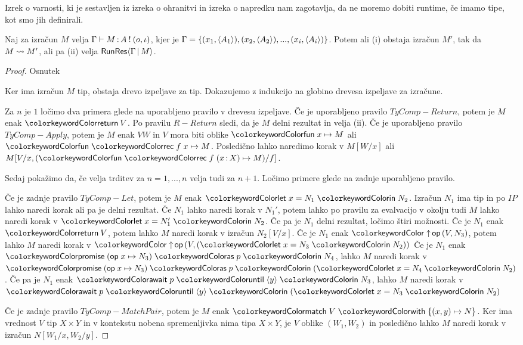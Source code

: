 Izrek o varnosti, ki je sestavljen iz izreka o ohranitvi in izreka o napredku nam zagotavlja, da ne moremo dobiti runtime, če imamo tipe, kot smo jih definirali.



\begin{trditev}[o napredku]\label{trd:gamma-napredek}
	Naj za izračun $M$ velja $\Gamma \vdash M \mathinner{:} A \mathbin{!} (o, \iota)$, kjer je $\Gamma = \{(x_1,\langle A_1 \rangle),(x_2,\langle A_2 \rangle),...,(x_i,\langle A_i \rangle)\}$. Potem ali (i) obstaja izračun $M'$, tak da $M \leadsto M'$, ali pa (ii) velja $\mathsf{RunRes}\langle\Gamma \,\vert\, M\rangle$.
\end{trditev}

\begin{proof}
	Osnutek
	
	Ker ima izračun $M$ tip, obstaja drevo izpeljave za tip.
	Dokazujemo z indukcijo na globino drevesa izpeljave za izračune.
	
	Za $n$ je $1$ ločimo dva primera glede na uporabljeno pravilo v drevesu izpeljave.
	Če je uporabljeno pravilo $TyComp-Return$, potem je $M$ enak $\tmreturn{V}$. Po pravilu $R-Return$ sledi, da je $M$ delni rezultat in velja (ii).
	Če je uporabljeno pravilo $TyComp-Apply$, potem je $M$ enak $V W$ in $V$ mora biti oblike $\tmfunano{x}{M}$ ali $\tmfunrecano{f}{x}{M}$. Posledično lahko naredimo korak v $M[W/x]$ ali $M[V/x, (\tmfunrec{f}{x \of X}{M})/f]$.
	
	Sedaj pokažimo da, če velja trditev za $n = 1,...,n$ velja tudi za $n+1$.
	Ločimo primere glede na zadnje uporabljeno pravilo.
	
	Če je zadnje pravilo $TyComp-Let$, potem je $M$ enak $\tmlet{x}{N_1}{N_2}$.
	Izračun $N_1$ ima tip in po $IP$ lahko naredi korak ali pa je delni rezultat. Če $N_1$ lahko naredi korak v $N_1'$, potem lahko po pravilu za evalvacijo v okolju tudi $M$ lahko naredi korak v $\tmlet{x}{N_1'}{N_2}$.
	Če pa je $N_1$ delni rezultat, ločimo štiri možnosti. 
	Če je $N_1$ enak $\tmreturn{V}$, potem lahko $M$ naredi korak v izračun $N_2[V/x]$. 
	Če je $N_1$ enak $\tmopout{op}{V}{N_3}$, potem lahko $M$ naredi korak v $\tmopout{op}{V}{(\tmlet{x}{N_3}{N_2})}$
	Če je $N_1$ enak $\tmwith{op}{x}{N_3}{p}{N_4}$, lahko $M$ naredi korak v $\tmwith{op}{x}{N_3}{p}{(\tmlet{x}{N_4}{N_2})}$. 
	Če pa je $N_1$ enak $\tmawait{p}{y}{N_3}$, lahko $M$ naredi korak v $\tmawait{p}{y}{(\tmlet{x}{N_3}{N_2})}$
	
	Če je zadnje pravilo $TyComp-MatchPair$, potem je $M$ enak $\tmmatch{V}{(x,y) \mapsto N}$. Ker ima vrednost $V$ tip $X \times Y$ in v kontekstu nobena spremenljivka nima tipa $X \times Y$, je $V$ oblike $(W_1,W_2)$ in posledično lahko $M$ naredi korak v izračun $N[W_1/x,W_2/y]$.
	

\end{proof}

